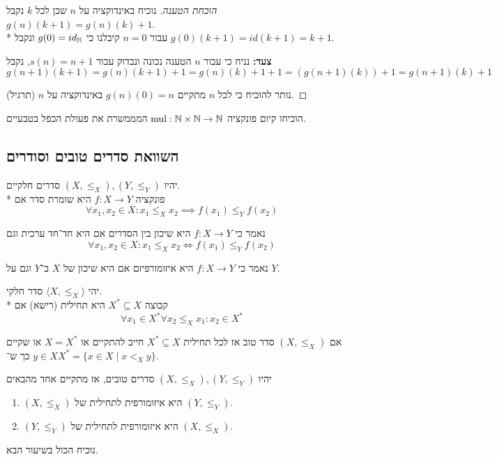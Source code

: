 \begin{proof}[הוכחת הטענה]
	נוכיח באינדוקציה על $n$ שכן לכל $k$ נקבל $g(n)(k + 1) = g(n)(k) + 1$. \\*
	עבור $n = 0$ קיבלנו כי $g(0) = id_{\mathbb{N}}$ ונקבל $g(0)(k + 1) = id(k + 1) = k + 1$.

	\textbf{צעד:}
	נניח כי עבור $n$ הטענה נכונה ונבדוק עבור $s(n) = n + 1$, נקבל
	\[
		g(n + 1)(k + 1) = g(n)(k + 1) + 1 = g(n)(k) + 1 + 1 = (g(n + 1)(k)) + 1 = g(n + 1)(k) + 1
	\]

	נותר להוכיח כי לכל $n$ מתקיים $g(n)(0) = n$ באינדוקציה על $n$ (תרגיל).
\end{proof}
\begin{exercise}
	הוכיחו קיום פונקציה $\text{mul} : \mathbb{N} \times \mathbb{N} \to \mathbb{N}$ המממשרת את פעולת הכפל בטבעיים.
\end{exercise}

\subsection{השוואת סדרים טובים וסודרים}
\begin{definition}
	יהיו $(X, \le_X), (Y, \le_Y)$ סדרים חלקיים. \\*
	פונקציה $f : X \to Y$ היא שומרת סדר אם
	\[
		\forall x_1, x_2 \in X : x_1 \le_X x_2 \implies f(x_1) \le_Y f(x_2)
	\]
\end{definition}
\begin{definition}[שיכון]
	נאמר כי $f : X \to Y$ היא שיכון בין הסדרים אם היא חד־חד ערכית וגם
	\[
		\forall x_1, x_2 \in X : x_1 \le_X x_2 \iff f(x_1) \le_Y f(x_2)
	\]
\end{definition}
\begin{definition}[איזומורפיזם]
	נאמר כי $f : X \to Y$ היא איזומורפיזם אם היא שיכון של $X$ ב־$Y$ וגם על $Y$.
\end{definition}
\begin{definition}
	יהי $\langle X, \le_X \rangle$ סדר חלקי. \\*
	קבוצה $X^* \subseteq X$ היא תחילית (רישא) אם
	\[
		\forall x_1 \in X^* \forall x_2 \le_X x_1 : x_2 \in X^*
	\]
\end{definition}
\begin{proposition}
	אם $(X, \le_X)$ סדר טוב אז לכל תחילית $X^* \subseteq X$ חייב להתקיים או $X = X^*$ או שקיים $y \in X$ כך ש־$X^* = \{ x \in X \mid x <_X y \}$.
\end{proposition}
\begin{theorem}
	יהיו $(X, \le_X), (Y, \le_Y)$ סדרים טובים, אז מתקיים אחד מהבאים
	\begin{enumerate}
		\item $(X, \le_X)$ היא איזומורפית לתחילית של $(Y, \le_Y)$.
		\item $(Y, \le_Y)$ היא איזומורפית לתחילית של $(X, \le_X)$.
	\end{enumerate}
\end{theorem}
נוכיח הכול בשיעור הבא.


